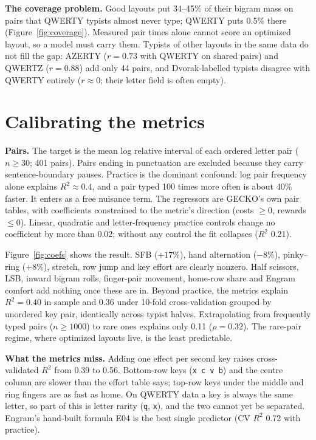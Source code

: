 \documentclass{gecko-paper}
\begin{document}
\begin{paperbody}

\textbf{The coverage problem.} Good layouts put 34–45\% of their bigram mass on pairs that QWERTY typists almost never type; QWERTY puts 0.5\% there (Figure~\ref{fig:coverage}). Measured pair times alone cannot score an optimized layout, so a model must carry them. Typists of other layouts in the same data do not fill the gap: AZERTY ($r=0.73$ with QWERTY on shared pairs) and QWERTZ ($r=0.88$) add only 44 pairs, and Dvorak-labelled typists disagree with QWERTY entirely ($r\approx0$; their letter field is often empty).

\section{Calibrating the metrics}
\textbf{Pairs.} The target is the mean log relative interval of each ordered letter pair ($n\ge30$; 401 pairs). Pairs ending in punctuation are excluded because they carry sentence-boundary pauses. Practice is the dominant confound: log pair frequency alone explains $R^2\approx0.4$, and a pair typed 100 times more often is about 40\% faster. It enters as a free nuisance term. The regressors are GECKO's own pair tables, with coefficients constrained to the metric's direction (costs $\ge0$, rewards $\le0$). Linear, quadratic and letter-frequency practice controls change no coefficient by more than 0.02; without any control the fit collapses ($R^2$ 0.21).


Figure~\ref{fig:coefs} shows the result. SFB ($+17\%$), hand alternation ($-8\%$), pinky–ring ($+8\%$), stretch, row jump and key effort are clearly nonzero. Half scissors, LSB, inward bigram rolls, finger-pair movement, home-row share and Engram comfort add nothing once these are in. Beyond practice, the metrics explain $R^2=0.40$ in sample and $0.36$ under 10-fold cross-validation grouped by unordered key pair, identically across typist halves. Extrapolating from frequently typed pairs ($n\ge1000$) to rare ones explains only 0.11 ($\rho=0.32$). The rare-pair regime, where optimized layouts live, is the least predictable.

\textbf{What the metrics miss.} Adding one effect per second key raises cross-validated $R^2$ from 0.39 to 0.56. Bottom-row keys (\texttt{x c v b}) and the centre column are slower than the effort table says; top-row keys under the middle and ring fingers are as fast as home. On QWERTY data a key is always the same letter, so part of this is letter rarity (\texttt{q}, \texttt{x}), and the two cannot yet be separated. Engram's hand-built formula E04 is the best single predictor (CV $R^2$ 0.72 with practice).


\end{paperbody}
\end{document}
